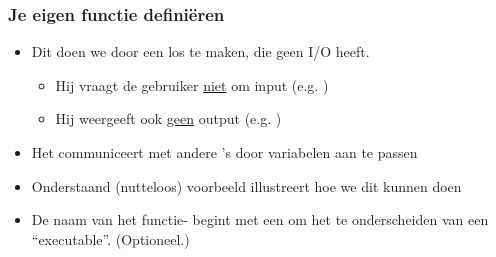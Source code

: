 \begin{frame}
\frametitle{Je eigen functie defini\"eren}


\begin{itemize}
  \item<1-> Dit doen we door een los  te maken, die geen I/O heeft.
  \begin{itemize}
    \item<2-> Hij vraagt de gebruiker \underline{niet} om input (e.g. )
    \item<3-> Hij weergeeft ook \underline{geen} output (e.g. )
  \end{itemize}
  \item<4-> Het  communiceert met andere 's door variabelen aan te passen
  \item<5-> Onderstaand (nutteloos) voorbeeld illustreert hoe we dit kunnen doen
  \item<6-> De naam van het functie- begint met een \tifonttxt{\theta} om het  te onderscheiden van een ``executable''. (Optioneel.)
\end{itemize}

\vspace{2.5cm}




\end{frame}





